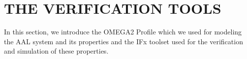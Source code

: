 \documentclass[a4paper,twoside]{article}
\def\sysml{\textsc{SysML}}
\def\uml{\textsc{Uml}}
\begin{document}



\section{\uppercase{The verification tools}}
\label{sec:tools}
\noindent In this section, we introduce the OMEGA2 Profile which we used for modeling the AAL system and its properties and the IFx toolset used for the verification and simulation of these properties. 
\end{document}
